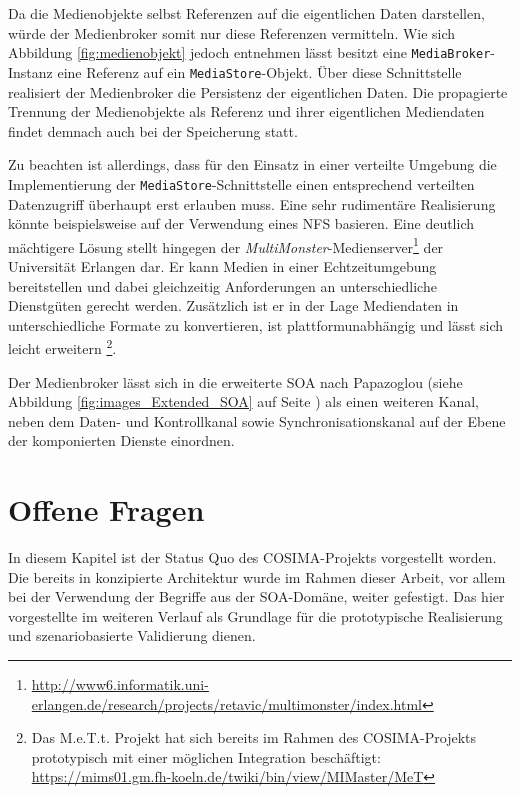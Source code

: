   Da die Medienobjekte selbst Referenzen auf die eigentlichen Daten darstellen, würde der Medienbroker somit nur diese Referenzen vermitteln. Wie sich Abbildung \ref{fig:medienobjekt} jedoch entnehmen lässt besitzt eine \verb!MediaBroker!-Instanz eine Referenz auf ein \verb!MediaStore!-Objekt. Über diese Schnittstelle realisiert der Medienbroker die Persistenz der eigentlichen Daten. Die propagierte Trennung der Medienobjekte als Referenz und ihrer eigentlichen Mediendaten findet demnach auch bei der Speicherung statt.
  
  Zu beachten ist allerdings, dass für den Einsatz in einer verteilte Umgebung die Implementierung der \verb!MediaStore!-Schnittstelle einen entsprechend verteilten Datenzugriff überhaupt erst erlauben muss. Eine sehr rudimentäre Realisierung könnte beispielsweise auf der Verwendung eines NFS basieren. Eine deutlich mächtigere Lösung stellt hingegen der \emph{MultiMonster}-Medienserver\footnote{\url{http://www6.informatik.uni-erlangen.de/research/projects/retavic/multimonster/index.html}} der Universität Erlangen dar. Er kann Medien in einer Echtzeitumgebung bereitstellen und dabei gleichzeitig Anforderungen an unterschiedliche Dienstgüten gerecht werden. Zusätzlich ist er in der Lage Mediendaten in unterschiedliche Formate zu konvertieren, ist plattformunabhängig und lässt sich leicht erweitern \citep{suchomski2004oar}\footnote{Das M.e.T.t. Projekt hat sich bereits im Rahmen des COSIMA-Projekts prototypisch mit einer möglichen Integration beschäftigt: \url{https://mims01.gm.fh-koeln.de/twiki/bin/view/MIMaster/MeT}}.
  
  Der Medienbroker lässt sich in die erweiterte SOA nach Papazoglou (siehe Abbildung \ref{fig:images_Extended_SOA} auf Seite \pageref{fig:images_Extended_SOA}) als einen weiteren Kanal, neben dem Daten- und Kontrollkanal sowie Synchronisationskanal auf der Ebene der komponierten Dienste einordnen.
  



\section{Offene Fragen} %
\label{sec:offene_fragen}

  In diesem Kapitel ist der Status Quo des COSIMA-Projekts vorgestellt worden. Die bereits in \citep{bericht} konzipierte Architektur wurde im Rahmen dieser Arbeit, vor allem bei der Verwendung der Begriffe aus der SOA-Domäne, weiter gefestigt. Das hier vorgestellte im weiteren Verlauf als Grundlage für die prototypische Realisierung und szenariobasierte Validierung dienen.


